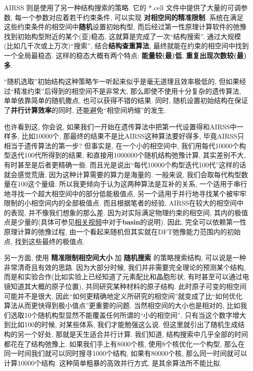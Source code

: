 \documentclass[a4paper, 10pt]{article}
\begin{document}
AIRSS 则是使用了另一种结构搜索的策略. 它的 *.cell 文件中提供了大量的可调参数, 每一个参数对应着若干约束条件, 可以实现 \textbf{对相空间的精准限制}. 系统在满足这些约束条件的相空间中\textbf{随机}设置初始构型, 而后经过第一性原理计算软件的弛豫找到初始构型附近的某个(亚)稳态, 这就算是完成了一次``结构搜索''. 通过大规模(比如几千次或上万次)``搜索'', 结合\textbf{结构查重算法}, 最终就能在约束的相空间中找到一个全局最稳态. 这样的稳态大概有两个特点: \textbf{能量较(最)低}, \textbf{重复出现次数较(最)多}.

``随机选取''初始结构这种策略乍一听起来似乎是毫无道理且效率极低的, 但如果经过``精准约束''后得到的相空间不是非常大, 那么即使不使用十分复杂的遗传算法, 单单依靠简单的随机撒点, 也可以获得不错的结果. 同时, 随机设置初始结构在保证了\textbf{并行计算效率}的同时, 还能避免``相空间坍缩''的发生. 

也许看到这, 你会说, 如果我们一开始在遗传算法中把第一代设置得和AIRSS中一样多, 比如10000个, 那最终的结果不是比AIRSS这种算法要好得多, 毕竟AIRSS只相当于遗传算法的第一步? 但事实是, 在一个小的相空间中, 我们用每代10000个构型迭代100代所得到的结果, 和直接用1000000个随机结构弛豫计算, 其实差别不大, 有时甚至是后者更精确一些. 而且光是说出``每代10000个构型迭代100代''这样的话就会感觉荒唐, 因为这种计算需要的算力是海量的. 一般来说, 我们会取每代构型数量在100这个量级. 所以我更倾向于认为这两种算法是互补的关系, 一个适用于串行地寻找一个超大相空间中的部分低能极值点, 另一个适用于并行地寻找某个被牢牢限制的小相空间内的全部极值点. 而且根据笔者的经验, AIRSS在较大的相空间中的表现, 并不像我们想象的那么差. 因为对实际满足物理约束的相空间, 其内的极值点是少量的(具体可参见\href{https://www.youtube.com/watch?v=xW6pOYEIKVs&t=1061s}{相关视频}中对于\textbf{basin}的说明). 因此, 完全可以依赖第一性原理计算的弛豫过程, 由一个看起来随机但其实就在DFT弛豫能力范围内的初始点, 找到这些最终的极值点.

另一方面, 使用 \textbf{精准限制相空间大小} 加 \textbf{随机搜索} 的策略搜索结构, 可以说是一种非常清奇且有效的思路. 因为大部分时候, 我们并非需要完全理论的预测某个结构, 而是和实验合作(比如实验上已经知道了元素配比和晶胞形状, 有时甚至可以通过电镜知道其大概的原子位置), 共同研究某种材料的原子结构. 此时原子可变的相空间可能并不是很大, 因此``如何更精确地定义所研究的相空间''就变成了比``如何优化算法从而更快得到极小值点''更重要的问题. 当然相空间的大小也是相对的, 比如我们选取10个随机构型显然不能覆盖任何所谓的``小的相空间'', 只有当这个数字增大到比如100的时候, 对某些体系, 我们才能勉强这么说. 但这里就引出了随机生成结构的另一个好处, 那就是天生适合并行计算. 我们知道, 结构搜索中几乎全部的时间都花在了结构弛豫上. 如果我们手上有8000个核, 使用8个核优化一个构型, 那么在同一时间我们就可以同时搜寻1000个结构, 如果有80000个核, 那么同一时间就可以计算10000个结构. 这种简单粗暴的高效并行方式, 是其余算法所不能比拟. 
\end{document}
